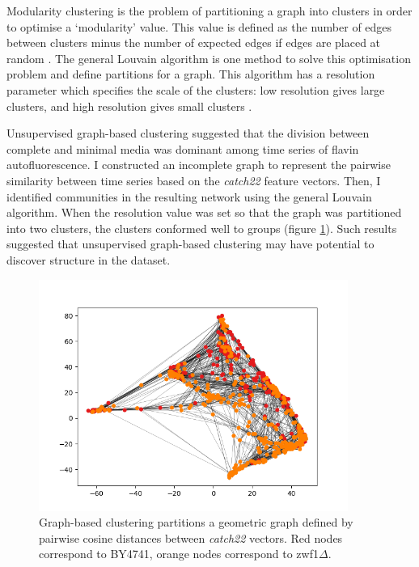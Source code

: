 Modularity clustering is the problem of partitioning a graph into clusters in order to optimise a `modularity' value.
This value is defined as the number of edges between clusters minus the number of expected edges if edges are placed at random \parencite{newmanModularityCommunityStructure2006}.
The general Louvain algorithm \parencite{blondelFastUnfoldingCommunities2008,muchaCommunityStructureTimeDependent2010} is one method to solve this optimisation problem and define partitions for a graph.
This algorithm has a resolution parameter which specifies the scale of the clusters: low resolution gives large clusters, and high resolution gives small clusters \parencite{fortunatoResolutionLimitCommunity2007}.

Unsupervised graph-based clustering suggested that the division between complete and minimal media was dominant among time series of flavin autofluorescence. %
I constructed an incomplete graph to represent the pairwise similarity between time series based on the \textit{catch22} feature vectors.
Then, I identified communities in the resulting network using the general Louvain algorithm.
When the resolution value was set so that the graph was partitioned into two clusters, the clusters conformed well to groups (figure \ref{fig:graphclustering}). %
Such results suggested that unsupervised graph-based clustering may have potential to discover structure in the dataset.


\begin{figure}[htbp]
  \centering
  \includegraphics[width=0.9\textwidth]{graphclustering}
  \caption{
    Graph-based clustering partitions a geometric graph defined by pairwise cosine distances between \textit{catch22} vectors.
    Red nodes correspond to BY4741, orange nodes correspond to zwf1$\Delta$.
  }
  \label{fig:graphclustering}
\end{figure}

